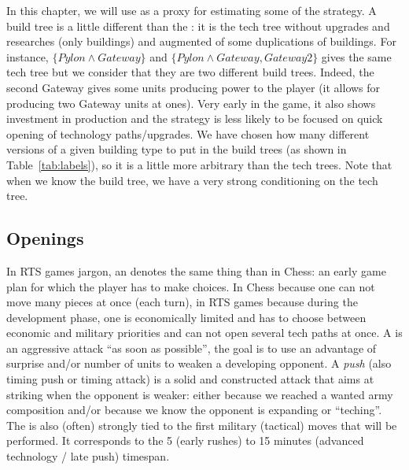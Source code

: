 In this chapter, we will use \textit{} as a proxy for estimating some of the strategy. A build tree is a little different than the : it is the tech tree without upgrades and researches (only buildings) and augmented of some duplications of buildings. For instance, $\{Pylon\wedge Gateway\}$ and $\{Pylon\wedge Gateway, Gateway2\}$ gives the same tech tree but we consider that they are two different build trees. Indeed, the second Gateway gives some units producing power to the player (it allows for producing two Gateway units at ones). Very early in the game, it also shows investment in production and the strategy is less likely to be focused on quick opening of technology paths/upgrades. 
We have chosen how many different versions of a given building type to put in the build trees (as shown in Table~\ref{tab:labels}), so it is a little more arbitrary than the tech trees. Note that when we know the build tree, we have a very strong conditioning on the tech tree.



\subsection{Openings}
\label{sec:openings}


In RTS games jargon, an \textit{} denotes the same thing than in Chess: an early game plan for which the player has to make choices. In Chess because one can not move many pieces at once (each turn), in RTS games because during the development phase, one is economically limited and has to choose between economic and military priorities and can not open several tech paths at once. A \textit{} is an aggressive attack ``as soon as possible'', the goal is to use an advantage of surprise and/or number of units to weaken a developing opponent. A \textit{push} (also timing push or timing attack) is a solid and constructed attack that aims at striking when the opponent is weaker: either because we reached a wanted army composition and/or because we know the opponent is expanding or ``teching''. The  is also (often) strongly tied to the first military (tactical) moves that will be performed. It corresponds to the 5 (early rushes) to 15 minutes (advanced technology / late push) timespan. 

